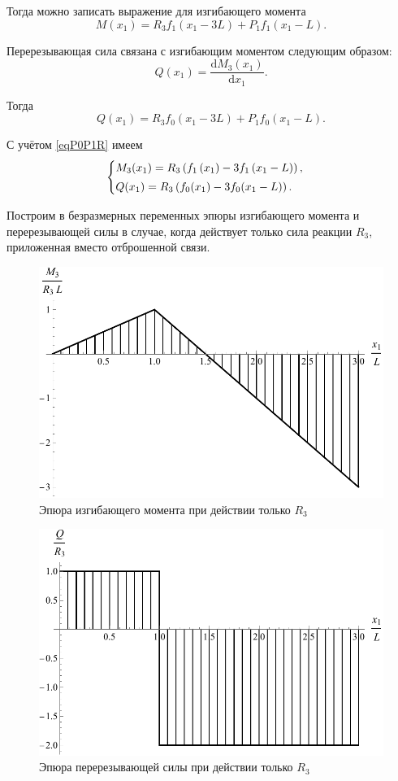 \documentclass[12pt, a4paper]{article}
\begin{document}
	Тогда можно записать выражение для изгибающего момента
	\[
	M(x_1) = R_3 f_1(x_1 - 3L) + P_1 f_1(x_1 - L).
	\]
	
	Перерезывающая сила связана с изгибающим моментом следующим образом:
	\begin{equation}
		Q(x_1) = \dfrac{\mathrm{d} M_3(x_1)}{\mathrm{d} x_1}.
		\label{eqQ}
	\end{equation}
	
	Тогда
	\[
	Q(x_1) = R_3 f_0(x_1 - 3L) + P_1 f_0(x_1 - L).
	\]
	
	С учётом \eqref{eqP0P1R} имеем
	\begin{equation}
		\begin{cases} \vspace{0.25em}
			M_3(x_1) = R_3 \left( f_1\left(x_1\right) - 3 f_1\left(x_1 - L\right) \right), \\
			Q(x_1) = R_3 \left( f_0(x_1) - 3 f_0(x_1 - L) \right). \\
		\end{cases}
		\label{eqM3QR}
	\end{equation}
	
	Построим в безразмерных переменных эпюры изгибающего момента и перерезывающей силы в случае, когда действует только сила реакции $R_3$, приложенная вместо отброшенной связи.
	
	\begin{figure}[!h]
		\centering
		\includegraphics[width=0.75\linewidth]{plot-5}
		\caption{Эпюра изгибающего момента при действии только $R_3$}
	\end{figure} 
	
	\newpage
	
	\begin{figure}[!h]
		\centering
		\includegraphics[width=0.75\linewidth]{plot-6}
		\caption{Эпюра перерезывающей силы при действии только $R_3$}
	\end{figure}
	
\end{document}
